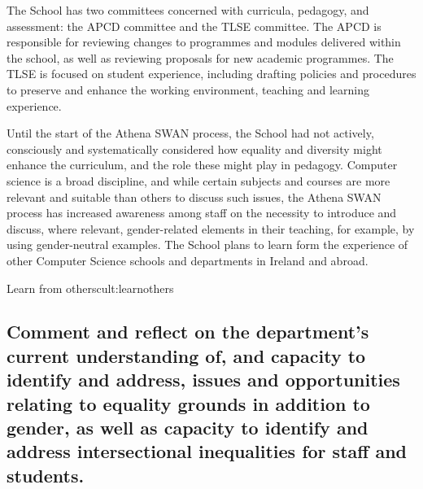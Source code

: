 

The School has two committees concerned with curricula, pedagogy, and assessment: the \ac{APCD} committee and the \ac{TLSE} committee.
The APCD is responsible for reviewing changes to programmes and modules delivered within the school, as well as reviewing proposals for new academic programmes. The \ac{TLSE} is focused on student experience, including drafting policies and procedures to preserve and enhance the working environment, teaching and learning experience. 

Until the start of the Athena SWAN process, the School had not actively, consciously and systematically considered how equality and diversity might enhance the curriculum, and the role these might play in pedagogy. Computer science is a broad discipline, and while certain subjects and courses are more relevant and suitable than others to discuss such issues, the Athena SWAN process has increased awareness among staff on the necessity to introduce and discuss, where relevant, gender-related elements in their teaching, for example, by using gender-neutral examples. The School plans to learn form the experience of other Computer Science schools and departments in Ireland and abroad.


\begin{actionblock}{\ksspace{}Learn from others}{cult:learnothers}
\actlearnfromothers
\hfill{
    \hypersetup{hidelinks}
    \hyperlink{e2}{\gotoactionsymbol{}}
}
\end{actionblock}


\subsection{Comment and reflect on the department’s current understanding of, and capacity to identify and address, issues and opportunities relating to equality grounds in addition to gender, as well as capacity to identify and address intersectional inequalities for staff and students.}

